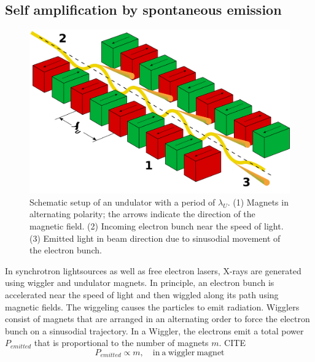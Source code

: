 \subsection{Self amplification by spontaneous emission}\label{sec:sase}
\begin{figure}[t]
	\centering
		\includegraphics[width=1.00\textwidth]{images/Undulator.png}
	\caption{Schematic setup of an undulator with a period of $\lambda_{U}$. (1) Magnets in alternating polarity; the arrows indicate the direction of the magnetic field. (2) Incoming electron bunch near the speed of light. (3) Emitted light in beam direction due to sinusodial movement of the electron bunch. \cite{holst-2005-wiki}}
	\label{fig:undulator}
\end{figure}
In synchrotron lightsources as well as free electron lasers, X-rays are generated using wiggler and undulator magnets. In principle, an electron bunch is accelerated near the speed of light and then wiggled along its path using magnetic fields. The wiggeling causes the particles to emit radiation. Wigglers consist of magnets that are arranged in an alternating order to force the electron bunch on a sinusodial trajectory. In a Wiggler, the electrons emit a total power $P_{emitted}$ that is proportional to the number of magnets $m$. CITE
\begin{equation}
P_{emitted} \propto m,\quad \mathrm{in\ a\ wiggler\ magnet}
\end{equation}
